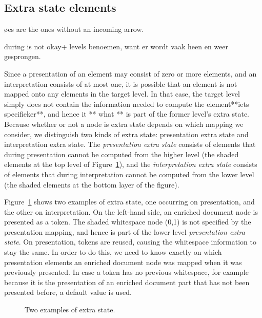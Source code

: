 %																
\subsection{Extra state elements} \label{sect:extraState}

\bl
\o es are the ones without an incoming arrow.
\el

\bc
during is not okay+ levels benoemen, want er wordt vaak heen en weer gesprongen.

Since a presentation of an element may consist of zero or more elements, and an interpretation consists of at most one, it is possible that an element is not mapped onto any elements in the target level. In that case, the target level simply does not contain the information needed to compute the element**iets specifieker**, and hence it ** what ** is part of the former level's extra state. Because whether or not a node is extra state depends on which mapping we consider, we distinguish two kinds of extra state: presentation extra state and interpretation extra state. The {\em presentation extra state} consists of elements that during presentation cannot be computed from the higher level (the shaded elements at the top level of Figure~\ref{layerExtraState}), and the {\em interpretation extra state} consists of elements that during interpretation cannot be computed from the lower level (the shaded elements at the bottom layer of the figure).
\ec


Figure~\ref{layerExtraState} shows two examples of extra state, one occurring on presentation, and the other on interpretation. On the left-hand side, an enriched document node is presented as a token. The shaded whitespace node (0,1) is not specified by the presentation mapping, and hence is part of the lower level {\em presentation extra state}. On presentation, tokens are reused, causing the whitespace information to stay the same. In order to do this, we need to know exactly on which presentation elements an enriched document node was mapped when it was previously presented. In case a token has no previous whitespace, for example because it is the presentation of an enriched document part that has not been presented before, a default value is used.

\begin{figure}
\begin{center}
\begin{center}
\end{center}
\caption{Two examples of extra state.} \label{layerExtraState} 
\end{center}
\end{figure}

